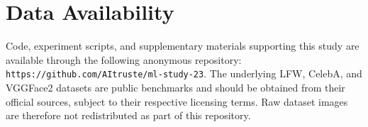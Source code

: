 \documentclass[a4paper,fleqn]{cas-dc}
\begin{document}
\section{Data Availability}
Code, experiment scripts, and supplementary materials supporting this study are available through the following anonymous repository:
\texttt{https://github.com/AItruste/ml-study-23}. The underlying LFW, CelebA, and VGGFace2 datasets are public benchmarks and should be obtained from their official sources, subject to their respective licensing terms. Raw dataset images are therefore not redistributed as part of this repository.




%





\end{document}

